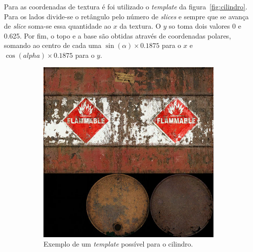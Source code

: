 \documentclass[a4paper]{article}
\begin{document}
Para as coordenadas de textura é foi utilizado o \textit{template} da
figura~\ref{fig:cilindro}. Para os lados divide-se o retângulo pelo número de
\textit{slices} e sempre que se avança de \textit{slice} soma-se essa quantidade
ao $x$ da textura. O $y$ so toma dois valores 0 e 0.625. Por fim, o topo e a
base são obtidas através de coordenadas polares, somando ao centro de cada uma
$\sin(\alpha) \times 0.1875$ para o $x$ e $\cos(alpha) \times 0.1875$ para o $y$.

\begin{figure}[H]
    \centering
    \begin{subfigure}{0.4\textwidth}
        \includegraphics{../assets/OilBarrel.jpg}
        \caption{Exemplo de um \textit{template} possível para o
        cilindro.}
    \end{subfigure}
    \begin{subfigure}{0.4\textwidth}
        \centering

\end{subfigure}
\end{figure}
\end{document}
